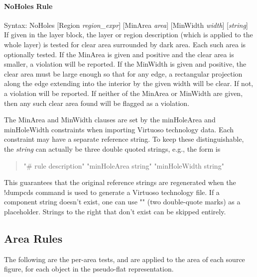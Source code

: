 \paragraph{{\et NoHoles} Rule}

\begin{description}
\item{Syntax: {\vt NoHoles} [{\vt Region} {\it region\_expr\/}]
 [{\vt MinArea} {\it area\/}] [{\vt MinWidth} {\it width\/}]
 [{\it string\/}]}\\

If given in the layer block, the layer or region description (which is
applied to the whole layer) is tested for clear area surrounded by
dark area.  Each such area is optionally tested.  If the {\vt MinArea}
is given and positive and the clear area is smaller, a violation will
be reported.  If the {\vt MinWidth} is given and positive, the clear
area must be large enough so that for any edge, a rectangular
projection along the edge extending into the interior by the given
width will be clear.  If not, a violation will be reported.  If
neither of the {\vt MinArea} or {\vt MinWidth} are given, then any
such clear area found will be flagged as a violation.

The {\vt MinArea} and {\vt MinWidth} clauses are set by the {\vt
minHoleArea} and {\vt minHoleWidth} constraints when importing
Virtuoso technology data.  Each constraint may have a separate
reference string.  To keep these distinguishable, the {\it string} can
actually be three double quoted strings, e.g., the form is

\begin{quote}\vt
"\# rule description" "minHoleArea string" "minHoleWidth string"
\end{quote}

This guarantees that the original reference strings are regenerated
when the {\cb !dumpcds} command is used to generate a Virtuoso
technology file.  If a component string doesn't exist, one can use
{\vt ""} (two double-quote marks) as a placeholder.  Strings to the
right that don't exist can be skipped entirely.
\end{description}

\subsection{Area Rules}

The following are the per-area tests, and are applied to the area of
each source figure, for each object in the pseudo-flat representation.

